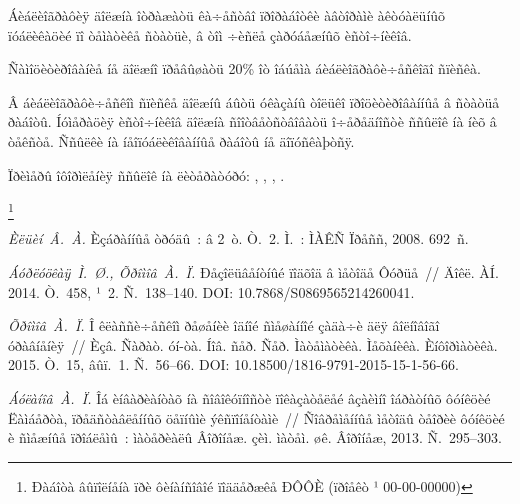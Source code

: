 \documentclass[12pt]{book}
\theoremstyle{plain}
\theoremstyle{remark}
\theoremstyle{plain}
\theoremstyle{definition}
\begin{document}
Áèáëèîãðàôèÿ äîëæíà îòðàæàòü êà÷åñòâî ïðîðàáîòêè àâòîðàìè
àêòóàëüíûõ ïóáëèêàöèé ïî òåìàòèêå ñòàòüè, â òîì ÷èñëå çàðóáåæíûõ
èñòî÷íèêîâ.

Ñàìîöèòèðîâàíèå íå äîëæíî ïðåâûøàòü 20\% îò îáúåìà
áèáëèîãðàôè÷åñêîãî ñïèñêà.


Â áèáëèîãðàôè÷åñêîì ñïèñêå äîëæíû áûòü óêàçàíû òîëüêî
ïðîöèòèðîâàííûå â ñòàòüå ðàáîòû. Íóìåðàöèÿ èñòî÷íèêîâ äîëæíà
ñîîòâåòñòâîâàòü î÷åðåäíîñòè ññûëîê íà íèõ â òåêñòå. Ññûëêè íà
íåîïóáëèêîâàííûå ðàáîòû íå äîïóñêàþòñÿ.

Ïðèìåðû îôîðìëåíèÿ ññûëîê íà ëèòåðàòóðó: \cite{Petr1},
\cite{Petr2,Petr3,Petr4}, \cite[ñ.~17]{Petr1}, \cite[òåîðåìà
1]{Petr1}.

\thanks{Ðàáîòà âûïîëíåíà ïðè ôèíàíñîâîé ïîääåðæêå ÐÔÔÈ
(ïðîåêò ¹ 00-00-00000)}

\begin{Rtwocolbib}%
\textit{Èëüèí~Â.~À.} Èçáðàííûå òðóäû~: â 2~ò. Ò.~2. Ì.~: ÌÀÊÑ
Ïðåññ, 2008. 692~ñ.

\textit{Áóðëóöêàÿ~Ì.~Ø., Õðîìîâ~À.~Ï.} Ðåçîëüâåíòíûé ïîäõîä â
ìåòîäå Ôóðüå~// Äîêë. ÀÍ. 2014. Ò.~458, ¹~2. Ñ.~138--140. DOI:
10.7868/S0869565214260041.

\textit{Õðîìîâ~À.~Ï.} Î êëàññè÷åñêîì ðåøåíèè îäíîé ñìåøàííîé
çàäà÷è äëÿ âîëíîâîãî óðàâíåíèÿ~// Èçâ. Ñàðàò. óí-òà. Íîâ. ñåð.
Ñåð. Ìàòåìàòèêà. Ìåõàíèêà. Èíôîðìàòèêà. 2015. Ò.~15, âûï.~1.
Ñ.~56--66. DOI: 10.18500/1816-9791-2015-15-1-56-66.

\textit{Áóëàíîâ~À.~Ï.} Îá èíâàðèàíòàõ íà ñîâîêóïíîñòè ïîêàçàòåëåé
âçàèìíî îáðàòíûõ ôóíêöèé Ëàìáåðòà, ïðåäñòàâëåííûõ öåïíûìè
ýêñïîíåíòàìè~// Ñîâðåìåííûå ìåòîäû òåîðèè ôóíêöèé è ñìåæíûå
ïðîáëåìû~: ìàòåðèàëû Âîðîíåæ. çèì. ìàòåì. øê. Âîðîíåæ, 2013.
Ñ.~295--303.
\end{Rtwocolbib}%
\end{document}
